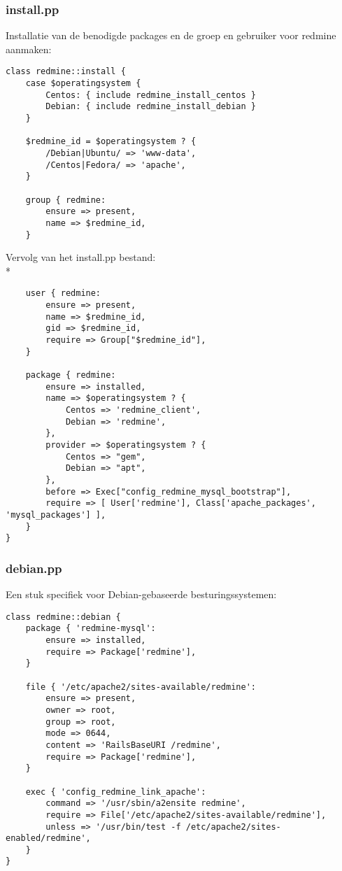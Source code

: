 \subsubsection{install.pp}
Installatie van de benodigde packages en de groep en gebruiker voor redmine aanmaken:
%
\begin{code}
\begin{lstlisting}
class redmine::install {
	case $operatingsystem {
		Centos: { include redmine_install_centos }
		Debian: { include redmine_install_debian }
	}

	$redmine_id = $operatingsystem ? {
		/Debian|Ubuntu/ => 'www-data',
		/Centos|Fedora/ => 'apache',
	}

	group { redmine:
		ensure => present,
		name => $redmine_id,
	}	
\end{lstlisting}
\end{code}
%
Vervolg van het install.pp bestand:\\*
\begin{code}
\begin{lstlisting}
	user { redmine:
		ensure => present,
		name => $redmine_id,
		gid => $redmine_id,
		require => Group["$redmine_id"],
	}

	package { redmine:
		ensure => installed,
		name => $operatingsystem ? {
			Centos => 'redmine_client',
			Debian => 'redmine',
		},
		provider => $operatingsystem ? {
			Centos => "gem",
			Debian => "apt",
		},
		before => Exec["config_redmine_mysql_bootstrap"],
		require => [ User['redmine'], Class['apache_packages', 'mysql_packages'] ],
	}
}
\end{lstlisting}
\end{code}
%
\subsubsection{debian.pp}
Een stuk specifiek voor Debian-gebaseerde besturingssystemen:
%
\begin{code}
\begin{lstlisting}
class redmine::debian {
	package { 'redmine-mysql':
		ensure => installed,
		require => Package['redmine'],
	}

	file { '/etc/apache2/sites-available/redmine':
		ensure => present,
		owner => root,
		group => root,
		mode => 0644,
		content => 'RailsBaseURI /redmine',
		require => Package['redmine'],
	}

	exec { 'config_redmine_link_apache':
		command => '/usr/sbin/a2ensite redmine',
		require => File['/etc/apache2/sites-available/redmine'],
		unless => '/usr/bin/test -f /etc/apache2/sites-enabled/redmine',
	}
}
\end{lstlisting}
\end{code}
%
